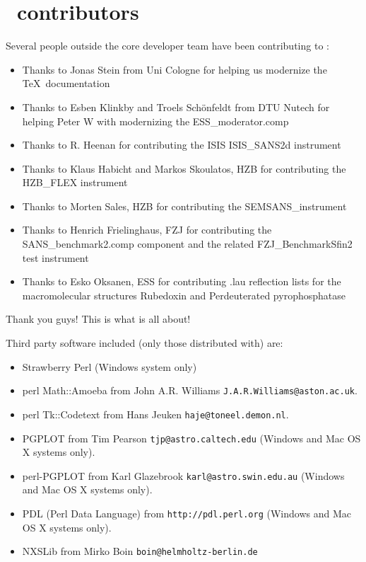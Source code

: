 \section*{\MCS \version\ contributors}

Several people outside the core developer team have been contributing
to \MCS \version:
\begin{itemize}
\item Thanks to Jonas Stein from Uni Cologne for helping us modernize the \TeX\ documentation
\item Thanks to Esben Klinkby and Troels Sch\"onfeldt from DTU Nutech for helping
  Peter W  with modernizing the ESS\_moderator.comp
\item Thanks to R. Heenan for contributing the ISIS ISIS\_SANS2d instrument 
\item Thanks to Klaus Habicht and Markos Skoulatos, HZB for
  contributing the HZB\_FLEX instrument
\item Thanks to Morten Sales, HZB  for contributing the SEMSANS\_instrument
\item Thanks to Henrich Frielinghaus, FZJ for contributing the
  SANS\_benchmark2.comp component and the related FZJ\_BenchmarkSfin2
  test instrument
\item Thanks to Esko Oksanen, ESS for contributing .lau reflection
  lists for the macromolecular structures Rubedoxin and Perdeuterated pyrophosphatase
\end{itemize}
Thank you guys! This is what \MCS is all about!

Third party software included (only those distributed with) \MCS are:
\begin{itemize}
\item Strawberry Perl (Windows system only)
\item perl Math::Amoeba from John A.R. Williams \verb+J.A.R.Williams@aston.ac.uk+.
\item perl Tk::Codetext from Hans Jeuken \verb+haje@toneel.demon.nl+.
\item PGPLOT from Tim Pearson \verb+tjp@astro.caltech.edu+ (Windows
  and Mac OS X systems only).
\item perl-PGPLOT from Karl Glazebrook \verb+karl@astro.swin.edu.au+ (Windows
  and Mac OS X systems only).
\item PDL (Perl Data Language) from \verb+http://pdl.perl.org+ (Windows
  and Mac OS X systems only).
\item NXSLib from Mirko Boin \verb+boin@helmholtz-berlin.de+
\end{itemize}

